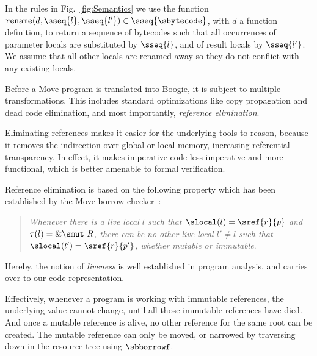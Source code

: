 In the rules in Fig.~\ref{fig:Semantics} we use the function
$\mathtt{rename}(d, \sseq{l}, \sseq{l'}) \in \sseq{\sbytecode}$, with $d$ a
function definition, to return a sequence of bytecodes such that all occurrences
of parameter locals are substituted by $\sseq{l}$, and of result locals by
$\sseq{l'}$. We assume that all other locals are renamed away so they do not
conflict with any existing locals.





Before a Move program is translated into Boogie, it is subject to multiple
transformations. This includes standard optimizations like copy propagation and
dead code elimination, and most importantly, \emph{reference elimination}.

Eliminating references makes it easier for the underlying tools to reason,
because it removes the indirection over global or local memory, increasing
referential transparency.  In effect, it makes imperative code less imperative
and more functional, which is better amenable to formal verification.

Reference elimination is based on the following property which has been
established by the Move borrow checker~\cite{BORROW_CHECKER}:
\begin{quote}
  \emph{Whenever there is a live local $l$ such that $\slocal(l) = \sref{r}{p}$
    and $\tau(l) = \&\smut~R$, there can be no other live local $l' \neq l$ such
    that $\slocal(l') = \sref{r}{p'}$, whether mutable or immutable}.
\end{quote}
Hereby, the notion of \emph{liveness} is well established in program analysis,
and carries over to our code representation.

Effectively, whenever a program is working with immutable references, the
underlying value cannot change, until all those immutable references have
died. And once a mutable reference is alive, no other reference for the same
root can be created. The mutable reference can only be moved, or narrowed by
traversing down in the resource tree using $\sbborrowf$.


